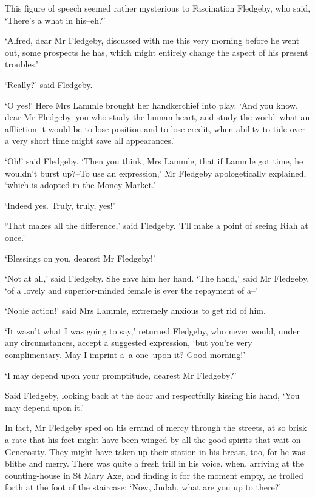 This figure of speech seemed rather mysterious to Fascination Fledgeby,
who said, ‘There’s a what in his--eh?’

‘Alfred, dear Mr Fledgeby, discussed with me this very morning before he
went out, some prospects he has, which might entirely change the aspect
of his present troubles.’

‘Really?’ said Fledgeby.

‘O yes!’ Here Mrs Lammle brought her handkerchief into play. ‘And you
know, dear Mr Fledgeby--you who study the human heart, and study the
world--what an affliction it would be to lose position and to lose
credit, when ability to tide over a very short time might save all
appearances.’

‘Oh!’ said Fledgeby. ‘Then you think, Mrs Lammle, that if Lammle
got time, he wouldn’t burst up?--To use an expression,’ Mr Fledgeby
apologetically explained, ‘which is adopted in the Money Market.’

‘Indeed yes. Truly, truly, yes!’

‘That makes all the difference,’ said Fledgeby. ‘I’ll make a point of
seeing Riah at once.’

‘Blessings on you, dearest Mr Fledgeby!’

‘Not at all,’ said Fledgeby. She gave him her hand. ‘The hand,’ said Mr
Fledgeby, ‘of a lovely and superior-minded female is ever the repayment
of a--’

‘Noble action!’ said Mrs Lammle, extremely anxious to get rid of him.

‘It wasn’t what I was going to say,’ returned Fledgeby, who never would,
under any circumstances, accept a suggested expression, ‘but you’re very
complimentary. May I imprint a--a one--upon it? Good morning!’

‘I may depend upon your promptitude, dearest Mr Fledgeby?’

Said Fledgeby, looking back at the door and respectfully kissing his
hand, ‘You may depend upon it.’

In fact, Mr Fledgeby sped on his errand of mercy through the streets,
at so brisk a rate that his feet might have been winged by all the good
spirits that wait on Generosity. They might have taken up their station
in his breast, too, for he was blithe and merry. There was quite a fresh
trill in his voice, when, arriving at the counting-house in St Mary Axe,
and finding it for the moment empty, he trolled forth at the foot of the
staircase: ‘Now, Judah, what are you up to there?’

